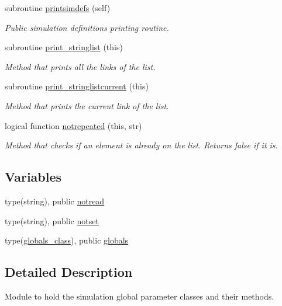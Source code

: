 \begin{DoxyCompactItemize}
subroutine \mbox{\hyperlink{namespacesimulationglobals__mod_a54196bff569fc838730ba39a722319ff}{printsimdefs}} (self)
\begin{DoxyCompactList}\small\item\em Public simulation definitions printing routine. \end{DoxyCompactList}\item 
subroutine \mbox{\hyperlink{namespacesimulationglobals__mod_a7adb33aaa9ea0a94c38789c07ff3e787}{print\+\_\+stringlist}} (this)
\begin{DoxyCompactList}\small\item\em Method that prints all the links of the list. \end{DoxyCompactList}\item 
subroutine \mbox{\hyperlink{namespacesimulationglobals__mod_a405f70548e38f0af65d4cbdb7c7025a4}{print\+\_\+stringlistcurrent}} (this)
\begin{DoxyCompactList}\small\item\em Method that prints the current link of the list. \end{DoxyCompactList}\item 
logical function \mbox{\hyperlink{namespacesimulationglobals__mod_a12410ee549ead4c6d892dca6ead74d15}{notrepeated}} (this, str)
\begin{DoxyCompactList}\small\item\em Method that checks if an element is already on the list. Returns false if it is. \end{DoxyCompactList}\end{DoxyCompactItemize}
\subsection*{Variables}
\begin{DoxyCompactItemize}
\item 
type(string), public \mbox{\hyperlink{namespacesimulationglobals__mod_a359d52eab96ddcaba05e0504eff0ef37}{notread}}
\item 
type(string), public \mbox{\hyperlink{namespacesimulationglobals__mod_a34d00a17e5931ddf3ab1a361f6299ae3}{notset}}
\item 
type(\mbox{\hyperlink{structsimulationglobals__mod_1_1globals__class}{globals\+\_\+class}}), public \mbox{\hyperlink{namespacesimulationglobals__mod_acf1e2786d81bd0fe337a8458efce8733}{globals}}
\end{DoxyCompactItemize}


\subsection{Detailed Description}
Module to hold the simulation global parameter classes and their methods. 

